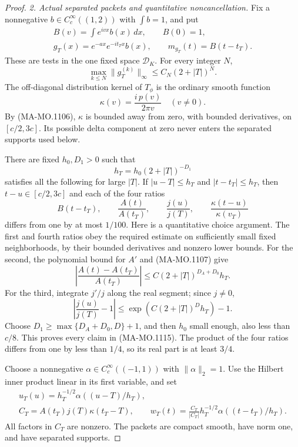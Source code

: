 \begin{proof}
\emph{2. Actual separated packets and quantitative
noncancellation.}
Fix a nonnegative \(b\in C_c^\infty((1,2))\)
with \(\int b=1\), and put
\[
 \begin{gathered}
 B(v)=\int e^{ivx}b(x)\,dx,\qquad B(0)=1,\\
 g_T(x)=e^{-ax}e^{-it_Tx}b(x),\qquad
 m_{g_T}(t)=B(t-t_T).
 \end{gathered}
\tag{MA-MO.1111}
\]
These are tests in the one fixed space
\(\mathscr D_K\).  For every integer \(N\),
\[
 \max_{k\le N}\|g_T^{(k)}\|_\infty
                           \le C_N(2+|T|)^N .
\tag{MA-MO.1112}
\]
The off-diagonal distribution kernel of
\(T_\phi\) is the ordinary smooth function
\[
                    \kappa(v)=\frac{i\,p(v)}{2\pi v}
                                      \quad(v\ne0).
\tag{MA-MO.1113}
\]
By (MA-MO.1106), \(\kappa\) is bounded away
from zero, with bounded derivatives, on
\([c/2,3c]\).  Its possible delta component
at zero never enters the separated supports
used below.

There are fixed \(h_0,D_1>0\) such that
\[
                        h_T=h_0(2+|T|)^{-D_1}
\tag{MA-MO.1114}
\]
satisfies all the following for large \(|T|\).
If \(|u-T|\le h_T\) and
\(|t-t_T|\le h_T\), then \(t-u\in[c/2,3c]\)
and each of the four ratios
\[
 B(t-t_T),\qquad
 \frac{A(t)}{A(t_T)},\qquad
 \frac{j(u)}{j(T)},\qquad
 \frac{\kappa(t-u)}{\kappa(v_T)}
\tag{MA-MO.1115}
\]
differs from one by at most \(1/100\).
Here is a quantitative choice argument.
The first and fourth ratios obey the
required estimate on sufficiently small
fixed neighborhoods, by their bounded
derivatives and nonzero lower bounds.
For the second, the polynomial bound for
\(A'\) and (MA-MO.1107) give
\[
 \left|\frac{A(t)-A(t_T)}{A(t_T)}\right|
                         \le C(2+|T|)^{D_A+D_0}h_T .
\]
For the third, integrate \(j'/j\) along
the real segment; since \(j\ne0\),
\[
 \left|\frac{j(u)}{j(T)}-1\right|
       \le \exp(C(2+|T|)^D h_T)-1 .
\]
Choose \(D_1\ge\max\{D_A+D_0,D\}+1\),
and then \(h_0\) small enough, also
less than \(c/8\).  This proves every
claim in (MA-MO.1115).  The product of
the four ratios differs from one by
less than \(1/4\), so its real part
is at least \(3/4\).

Choose a nonnegative \(\alpha\in C_c^\infty((-1,1))\)
with \(\|\alpha\|_2=1\).  Use the Hilbert inner
product linear in its first variable, and set
\[
 \begin{gathered}
 u_T(u)=h_T^{-1/2}\alpha((u-T)/h_T),\\
 C_T=A(t_T)j(T)\kappa(t_T-T),\qquad
 w_T(t)=\frac{C_T}{|C_T|}
               h_T^{-1/2}\alpha((t-t_T)/h_T).
 \end{gathered}
\tag{MA-MO.1116}
\]
All factors in \(C_T\) are nonzero.
The packets are compact smooth, have
norm one, and have separated supports.


\end{proof}
